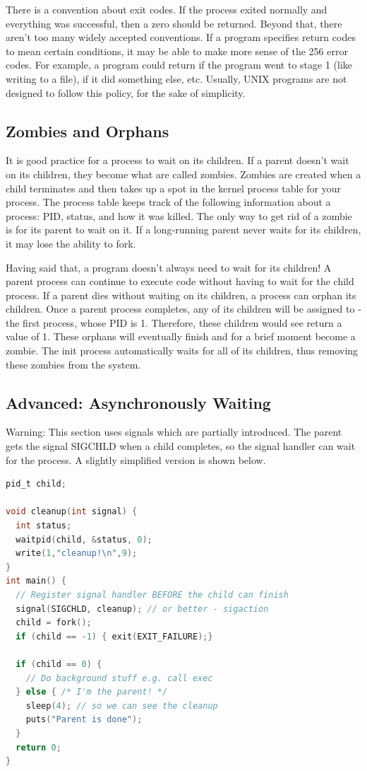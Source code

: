 There is a convention about exit codes.
If the process exited normally and everything was successful, then a zero should be returned.
Beyond that, there aren't too many widely accepted conventions.
If a program specifies return codes to mean certain conditions, it may be able to make more sense of the 256 error codes.
For example, a program could return  if the program went to stage 1 (like writing to a file),  if it did something else, etc.
Usually, UNIX programs are not designed to follow this policy, for the sake of simplicity.


\subsection{Zombies and Orphans}

It is good practice for a process to wait on its children.
If a parent doesn't wait on its children, they become what are called zombies.
Zombies are created when a child terminates and then takes up a spot in the kernel process table for your process.
The process table keeps track of the following information about a process: PID, status, and how it was killed.
The only way to get rid of a zombie is for its parent to wait on it.
If a long-running parent never waits for its children, it may lose the ability to fork.

Having said that, a program doesn't always need to wait for its children!
A parent process can continue to execute code without having to wait for the child process.
If a parent dies without waiting on its children, a process can orphan its children.
Once a parent process completes, any of its children will be assigned to  - the first process, whose PID is 1.
Therefore, these children would see  return a value of 1.
These orphans will eventually finish and for a brief moment become a zombie.
The init process automatically waits for all of its children, thus removing these zombies from the system.

\subsection{Advanced: Asynchronously Waiting}

Warning: This section uses signals which are partially introduced.
The parent gets the signal SIGCHLD when a child completes, so the signal handler can wait for the process.
A slightly simplified version is shown below.

\begin{lstlisting}[language=C]
pid_t child;

void cleanup(int signal) {
  int status;
  waitpid(child, &status, 0);
  write(1,"cleanup!\n",9);
}
int main() {
  // Register signal handler BEFORE the child can finish
  signal(SIGCHLD, cleanup); // or better - sigaction
  child = fork();
  if (child == -1) { exit(EXIT_FAILURE);}

  if (child == 0) {
    // Do background stuff e.g. call exec
  } else { /* I'm the parent! */
    sleep(4); // so we can see the cleanup
    puts("Parent is done");
  }
  return 0;
}
\end{lstlisting}

